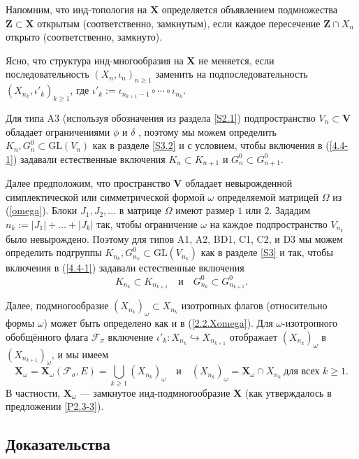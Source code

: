 \documentclass{amsart}
\theoremstyle{definition}
\begin{document}
Напомним, что инд-топология на $\mathbf{X}$ определяется объявлением подмножества $\mathbf{Z}\subset\mathbf{X}$ открытым (соответственно, замкнутым), если каждое пересечение $\mathbf{Z}\cap X_n$ открыто (соответственно, замкнуто).

Ясно, что структура инд-многообразия на $\mathbf{X}$ не меняется, если последовательность $(X_n,\iota_n)_{n\geq 1}$ заменить на подпоследовательность $(X_{n_k},\iota'_k)_{k\geq 1}$,
где $\iota'_k:=\iota_{n_{k+1}-1}\circ\cdots\circ\iota_{n_k}$.

Для типа A3 (используя обозначения из раздела \ref{S2.1}) подпространство $V_n\subset\mathbf{V}$ обладает ограничениями $\phi$ и $\delta$
, поэтому мы можем определить $K_n,G_n^0\subset \mathrm{GL}(V_n)$ как в разделе \ref{S3.2}
и с условием, чтобы включения в (\ref{4.4-1}) задавали  естественные включения
$K_n\subset K_{n+1}$ и $G_n^0\subset G_{n+1}^0$.

Далее предположим, что пространство $\mathbf{V}$ обладает невырожденной симплектической или симметрической формой $\omega$ определяемой матрицей $\Omega$ из (\ref{omega}).
Блоки $J_1,J_2,\ldots$ в матрице $\Omega$ имеют размер $1$ или $2$.
Зададим $n_k:=|J_1|+\ldots+|J_k|$
так, чтобы ограничение $\omega$ на каждое подпространство $V_{n_k}$ было невырождено.
Поэтому для типов A1, A2, BD1, C1, C2, и D3 мы можем определить
подгруппы $K_{n_k},G_{n_k}^0\subset \mathrm{GL}(V_{n_k})$
как в разделе \ref{S3}
и так, чтобы включения в (\ref{4.4-1}) задавали естественные включения
\[K_{n_k}\subset K_{n_{k+1}}\quad\mbox{и}\quad G^0_{n_k}\subset G^0_{n_{k+1}}.\]

Далее, подмногообразие $(X_{n_k})_\omega\subset X_{n_k}$ изотропных флагов (относительно формы $\omega$) может быть определено как и в (\ref{2.2.Xomega}).
Для $\omega$-изотропного обобщённого флага $\mathcal{F}_\sigma$  включение
$\iota'_k:X_{n_k}\hookrightarrow X_{n_{k+1}}$ отображает $(X_{n_k})_\omega$ в $(X_{n_{k+1}})_\omega$, и мы имеем
\[\mathbf{X}_\omega=\mathbf{X}_\omega(\mathcal{F}_\sigma,E)=\bigcup_{k\geq 1}(X_{n_k})_\omega\quad\mbox{и}\quad (X_{n_k})_\omega=\mathbf{X}_\omega\cap X_{n_k}\ \mbox{для всех $k\geq 1$}.\]
В частности, $\mathbf{X}_\omega$ --- замкнутое инд-подмногообразие $\mathbf{X}$
(как утверждалось в предложении \ref{P2.3-3}).

\subsection{Доказательства}

\label{S4.proofs}
\end{document}
